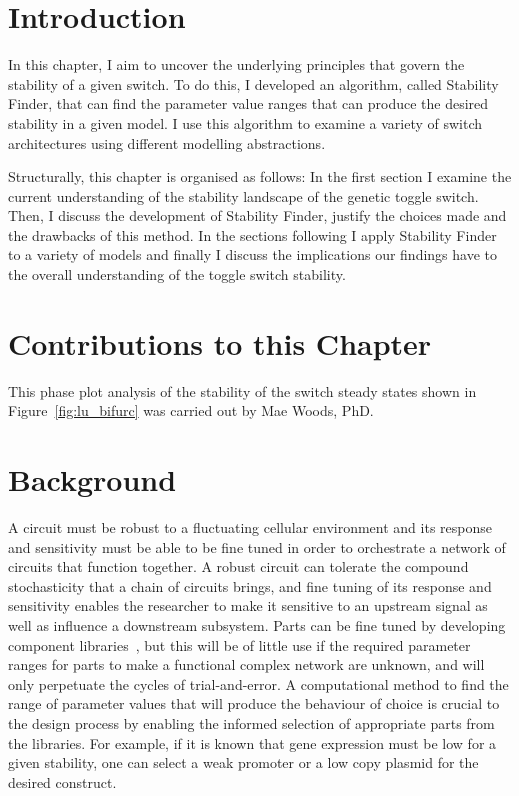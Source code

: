 \section{Introduction}

In this chapter, I aim to uncover the underlying principles that govern the stability of a given switch. To do this, I developed an algorithm, called Stability Finder, that can find the parameter value ranges that can produce the desired stability in a given model. I use this algorithm to examine a variety of switch architectures using different modelling abstractions.

Structurally, this chapter is organised as follows: In the first section I examine the current understanding of the stability landscape of the genetic toggle switch. Then, I discuss the development of Stability Finder, justify the choices made and the drawbacks of this method. In the sections following I apply Stability Finder to a variety of models and finally I discuss the implications our findings have to the overall understanding of the toggle switch stability. 

\section{Contributions to this Chapter}
This phase plot analysis of the stability of the switch steady states shown in Figure~\ref{fig:lu_bifurc} was carried out by Mae Woods, PhD.

\section{Background}
A circuit must be robust to a fluctuating cellular environment and its response and sensitivity must be able to be fine tuned in order to orchestrate a network of circuits that function together. A robust circuit can tolerate the compound stochasticity that a chain of circuits brings, and fine tuning of its response and sensitivity enables the researcher to make it sensitive to an upstream signal as well as influence a downstream subsystem. Parts can be fine tuned by developing component libraries~\autocite{Lu:2009ez,}, but this will be of little use if the required parameter ranges for parts to make a functional complex network are unknown, and will only perpetuate the cycles of trial-and-error. A computational method to find the range of parameter values that will produce the behaviour of choice is crucial to the design process by enabling the informed selection of appropriate parts from the libraries. For example, if it is known that gene expression must be low for a given stability, one can select a weak promoter or a low copy plasmid for the desired construct. 

